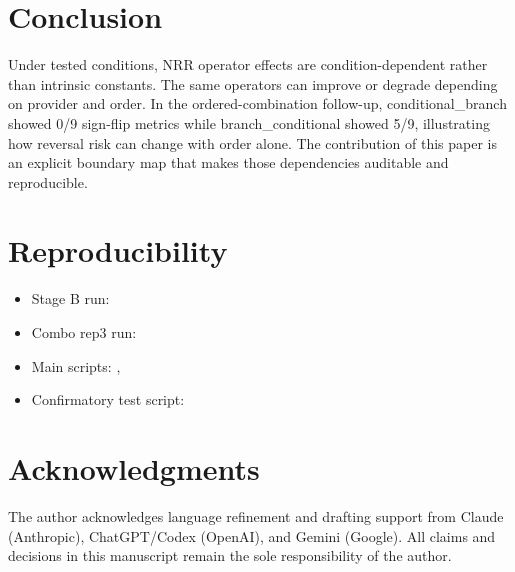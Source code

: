 \documentclass[11pt,a4paper]{article}
\begin{document}
\section{Conclusion}
\label{sec:conclusion}

Under tested conditions, NRR operator effects are condition-dependent rather than intrinsic constants. The same operators can improve or degrade depending on provider and order. In the ordered-combination follow-up, conditional\_branch showed 0/9 sign-flip metrics while branch\_conditional showed 5/9, illustrating how reversal risk can change with order alone. The contribution of this paper is an explicit boundary map that makes those dependencies auditable and reproducible.

\section{Reproducibility}
\label{sec:repro}

\begin{itemize}
  \item Stage B run: 
  \item Combo rep3 run: 
  \item Main scripts:
    ,
  \item Confirmatory test script:
\end{itemize}

\section*{Acknowledgments}
The author acknowledges language refinement and drafting support from Claude
(Anthropic), ChatGPT/Codex (OpenAI), and Gemini (Google). All claims and
decisions in this manuscript remain the sole responsibility of the author.
\end{document}
